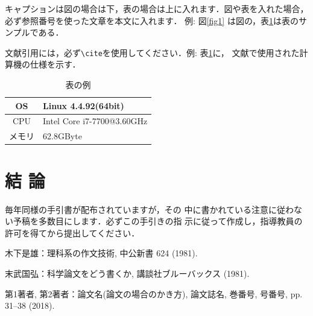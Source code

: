 \documentclass[10pt,twocolumn, a4j]{jsarticle}
\makeatletter
\def\@biblabel#1{#1)}
\makeatother
\begin{document}
キャプションは図の場合は下，表の場合は上に入れます．図や表を入れた場合，
必ず参照番号を使った文章を本文に入れます．
例: 図\ref{fig1} は図の，表\ref{table1}は表のサンプルである．

文献引用には，必ず\verb+\cite+を使用してください．例: 表\ref{table1}に，
文献\cite{labelName}で使用された計算機の仕様を示す．

\begin{table}[!htb]
 \begin{center}
   \caption{表の例}
  \begin{tabular}{|c|l|} \hline
  OS &  Linux 4.4.92(64bit) \\ \hline
  CPU & Intel Core i7-7700@3.60GHz\\ \hline
 メモリ & 62.8GByte\\ \hline
  \end{tabular}
 \label{table1}
 \end{center}
\end{table}


\section{結 論}
毎年同様の手引書が配布されていますが，その
中に書かれている注意に従わない予稿を多数目にします．必ずこの手引きの指
示に従って作成し，指導教員の許可を得てから提出してください．


\nocite{kinosita}
\nocite{suetake}
\nocite{labelName}


\makeatletter
\def\@biblabel#1{#1)}
\makeatother


\begin{thebibliography}{1}

木下是雄：理科系の作文技術, 中公新書 624 (1981).

末武国弘：科学論文をどう書くか, 講談社ブルーバックス (1981).

第1著者, 第2著者：論文名(論文の場合のかき方), 論文誌名, 巻番号, 号番号, pp.
  31--38 (2018).
\end{thebibliography}

%

   
\end{document}
